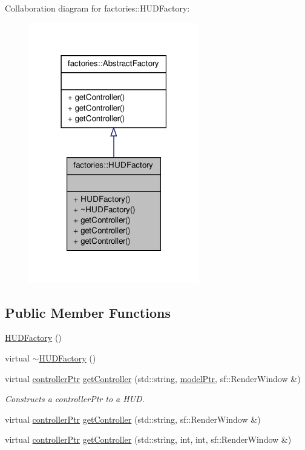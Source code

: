 \-Collaboration diagram for factories\-:\-:\-H\-U\-D\-Factory\-:
\nopagebreak
\begin{figure}[H]
\begin{center}
\leavevmode
\includegraphics[width=210pt]{dd/db6/classfactories_1_1HUDFactory__coll__graph}
\end{center}
\end{figure}
\subsection*{\-Public \-Member \-Functions}
\begin{DoxyCompactItemize}
\item 
\hyperlink{classfactories_1_1HUDFactory_ad7a49569458558b586c07da27276b325}{\-H\-U\-D\-Factory} ()
\item 
virtual \hyperlink{classfactories_1_1HUDFactory_a4475f46b84cec4cfa035dfe25c827f1a}{$\sim$\-H\-U\-D\-Factory} ()
\item 
virtual \hyperlink{Game_8h_a21b04f6cf2d5990b82725fac5ea2ce9a}{controller\-Ptr} \hyperlink{classfactories_1_1HUDFactory_a3b759e9a6b8be4a33eeb6a29d6334050}{get\-Controller} (std\-::string, \hyperlink{ModelView_8h_a78966ddb517fca8d2b29a2bc5c31e74e}{model\-Ptr}, sf\-::\-Render\-Window \&)
\begin{DoxyCompactList}\small\item\em \-Constructs a controller\-Ptr to a \-H\-U\-D. \end{DoxyCompactList}\item 
virtual \hyperlink{Game_8h_a21b04f6cf2d5990b82725fac5ea2ce9a}{controller\-Ptr} \hyperlink{classfactories_1_1HUDFactory_a8ddf78ffcee707564a254d9193728df7}{get\-Controller} (std\-::string, sf\-::\-Render\-Window \&)
\item 
virtual \hyperlink{Game_8h_a21b04f6cf2d5990b82725fac5ea2ce9a}{controller\-Ptr} \hyperlink{classfactories_1_1HUDFactory_a63987c73db069e83d25ea99c08aa97a9}{get\-Controller} (std\-::string, int, int, sf\-::\-Render\-Window \&)
\end{DoxyCompactItemize}


